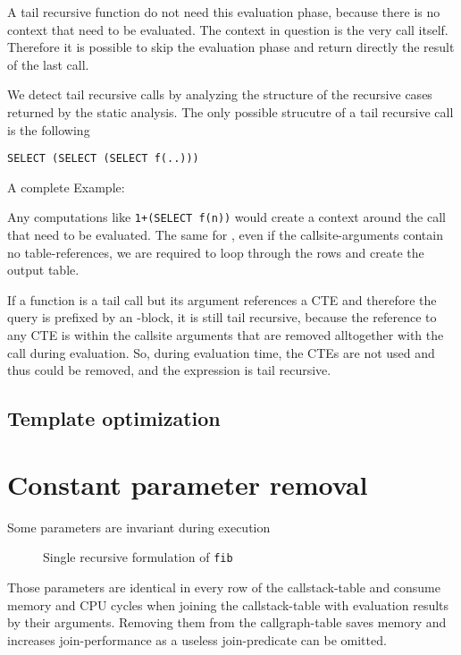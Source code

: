 A tail recursive function do not need this evaluation phase, because there is no context that need to be evaluated. The context in question is the very call itself. Therefore it is possible to skip the evaluation phase and return directly the result of the last call.

We detect tail recursive calls by analyzing the structure of the recursive cases returned by the static analysis. The only possible strucutre of a tail recursive call is the following
\begin{verbatim}
SELECT (SELECT (SELECT f(..)))
\end{verbatim}
A complete Example:

Any computations like \texttt{1+(SELECT f(n))} would create a context around the call that need to be evaluated. The same for \FROM, even if the callsite-arguments contain no table-references, we are required to loop through the rows and create the output table.

If a function is a tail call but its argument references a CTE and therefore the query is prefixed by an \WITH-block, it is still tail recursive, because the reference to any CTE is within the callsite arguments that are removed alltogether with the call during evaluation. So, during evaluation time, the CTEs are not used and thus could be removed, and the expression is tail recursive.
\subsection{Template optimization}






\section{Constant parameter removal}

Some parameters are invariant during execution 

\begin{wrapfigure}{r}{0.5\textwidth}
  \vspace{-20pt}
  \caption{Single recursive formulation of \texttt{fib}}
  \label{lst:fib_tr}
\end{wrapfigure}

Those parameters are identical in every row of the callstack-table and consume memory and CPU cycles when joining the callstack-table with evaluation results by their arguments.
Removing them from the callgraph-table saves memory and increases join-performance as a useless join-predicate can be omitted.

